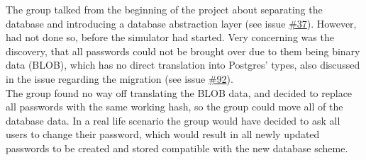 The group talked from the beginning of the project about separating the database and introducing a database abstraction layer (see issue \href{https://github.com/DevelOpsITU/MiniTwit/issues/37}{\#37}). However, had not done so, before the simulator had started. %
Very concerning was the discovery, that all passwords could not be brought over due to them being binary data (BLOB), which has no direct translation into Postgres' types, also discussed in the issue regarding the migration (see issue \href{https://github.com/DevelOpsITU/MiniTwit/issues/92}{\#92}). \\

The group found no way off translating the BLOB data, and decided to replace all passwords with the same working hash, so the group could move all of the database data. In a real life scenario the group would have decided to ask all users to change their password, which would result in all newly updated passwords to be created and stored compatible with the new database scheme.


